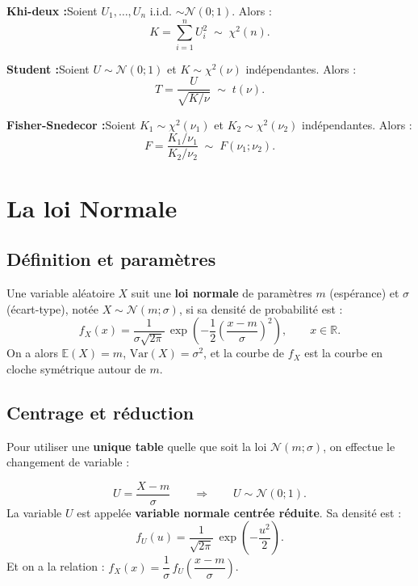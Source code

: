 \documentclass[11pt,a4paper]{article}
\newcommand{\N}{\mathcal{N}}
\newcommand{\E}{\mathbb{E}}
\newcommand{\Var}{\mathrm{Var}}
\newcommand{\R}{\mathbb{R}}
\begin{document}
\begin{thmbox}
\textbf{Khi-deux :}\quad Soient $U_1,\ldots,U_n$ i.i.d. $\sim \N(0;1)$. Alors :
$$K = \sum_{i=1}^{n} U_i^2 \;\sim\; \chi^2(n).$$

\textbf{Student :}\quad Soient $U \sim \N(0;1)$ et $K \sim \chi^2(\nu)$ ind\'ependantes. Alors :
$$T = \frac{U}{\sqrt{K/\nu}} \;\sim\; t(\nu).$$

\textbf{Fisher-Snedecor :}\quad Soient $K_1 \sim \chi^2(\nu_1)$ et $K_2 \sim \chi^2(\nu_2)$ ind\'ependantes. Alors :
$$F = \frac{K_1/\nu_1}{K_2/\nu_2} \;\sim\; F(\nu_1;\nu_2).$$
\end{thmbox}

\section{La loi Normale}

\subsection{D\'efinition et param\`etres}

\begin{defbox}
Une variable al\'eatoire $X$ suit une \textbf{loi normale} de param\`etres $m$ (esp\'erance) et $\sigma$ (\'ecart-type), not\'ee $X \sim \N(m;\sigma)$, si sa densit\'e de probabilit\'e est :
$$f_X(x) = \frac{1}{\sigma\sqrt{2\pi}}\,\exp\!\left(-\frac{1}{2}\left(\frac{x-m}{\sigma}\right)^{\!2}\right), \qquad x \in \R.$$
On a alors $\E(X)=m$, $\Var(X)=\sigma^2$, et la courbe de $f_X$ est la \og{}courbe en cloche\fg{} sym\'etrique autour de $m$.
\end{defbox}

\subsection{Centrage et r\'eduction}

Pour utiliser une \textbf{unique table} quelle que soit la loi $\N(m;\sigma)$, on effectue le changement de variable :

\begin{defbox}
$$U = \frac{X - m}{\sigma} \qquad\Longrightarrow\qquad U \sim \N(0;1).$$
La variable $U$ est appel\'ee \textbf{variable normale centr\'ee r\'eduite}. Sa densit\'e est :
$$f_U(u) = \frac{1}{\sqrt{2\pi}}\,\exp\!\left(-\frac{u^2}{2}\right).$$
Et on a la relation : $f_X(x) = \dfrac{1}{\sigma}\,f_U\!\left(\dfrac{x-m}{\sigma}\right)$.
\end{defbox}
\end{document}
